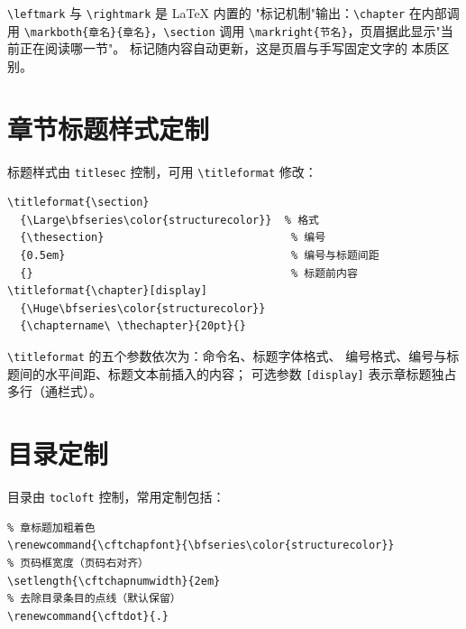 \verb|\leftmark| 与 \verb|\rightmark| 是 LaTeX 内置的
"标记机制"输出：\verb|\chapter| 在内部调用
\verb|\markboth{章名}{章名}|，\verb|\section| 调用
\verb|\markright{节名}|，页眉据此显示"当前正在阅读哪一节"。
标记随内容自动更新，这是页眉与手写固定文字的
本质区别。

\section{章节标题样式定制}

标题样式由 \texttt{titlesec} 控制，可用
\verb|\titleformat| 修改：

\begin{lstlisting}
\titleformat{\section}
  {\Large\bfseries\color{structurecolor}}  % 格式
  {\thesection}                             % 编号
  {0.5em}                                   % 编号与标题间距
  {}                                        % 标题前内容
\titleformat{\chapter}[display]
  {\Huge\bfseries\color{structurecolor}}
  {\chaptername\ \thechapter}{20pt}{}
\end{lstlisting}

\verb|\titleformat| 的五个参数依次为：命令名、标题字体格式、
编号格式、编号与标题间的水平间距、标题文本前插入的内容；
可选参数 \texttt{[display]} 表示章标题独占多行（通栏式）。

\section{目录定制}

目录由 \texttt{tocloft} 控制，常用定制包括：

\begin{lstlisting}
% 章标题加粗着色
\renewcommand{\cftchapfont}{\bfseries\color{structurecolor}}
% 页码框宽度（页码右对齐）
\setlength{\cftchapnumwidth}{2em}
% 去除目录条目的点线（默认保留）
\renewcommand{\cftdot}{.}
\end{lstlisting}

